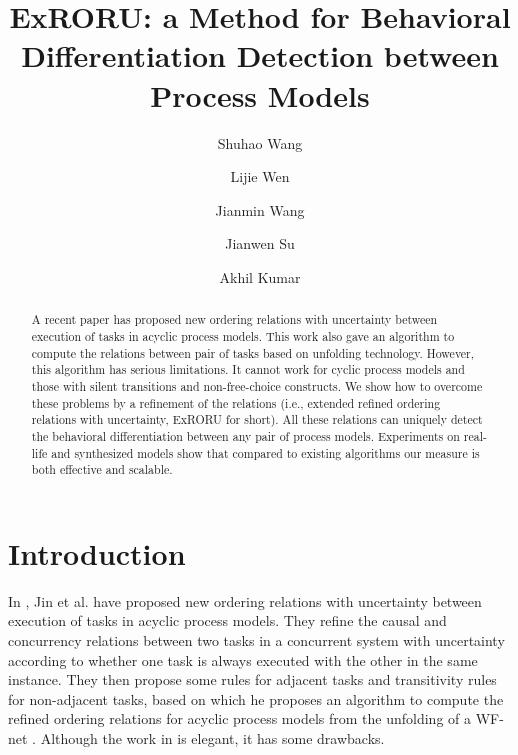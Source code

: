 \documentclass{llncs}
\begin{document}
\frontmatter 
\pagestyle{headings}

\mainmatter
\title{ExRORU: a Method for Behavioral Differentiation Detection between Process Models}

\author[$1$]{Shuhao Wang}
\author[$1$]{Lijie Wen}
\author[$1$]{Jianmin Wang}
\author[$2$]{Jianwen Su}
\author[$3$]{Akhil Kumar}
\institute{}

\maketitle

\begin{abstract}
A recent paper has proposed new ordering relations with uncertainty between execution of tasks in acyclic process models. This work also gave an algorithm to compute the relations between pair of tasks based on unfolding technology. However, this algorithm has serious limitations. It cannot work for cyclic process models and those with silent transitions and non-free-choice constructs. We show how to overcome these problems by a refinement of the relations (i.e., extended refined ordering relations with uncertainty, ExRORU for short). All these relations can uniquely detect the behavioral differentiation between any pair of process models. Experiments on real-life and synthesized models show that compared to existing algorithms our measure is both effective and scalable.
\end{abstract}

\section{Introduction}\label{sec:introduction}

In \cite{jin2014computing}, Jin et al. have proposed new ordering relations with uncertainty between execution of tasks in acyclic process models. They refine the causal and concurrency relations between two tasks in a concurrent system with uncertainty according to whether one task is always executed with the other in the same instance. They then propose some rules for adjacent tasks and transitivity rules for non-adjacent tasks, based on which he proposes an algorithm to compute the refined ordering relations for acyclic process models from the unfolding of a WF-net \cite{mcmillan1995technique,esparza1996improvement}. Although the work in \cite{jin2014computing} is elegant, it has some drawbacks.
\end{document}
